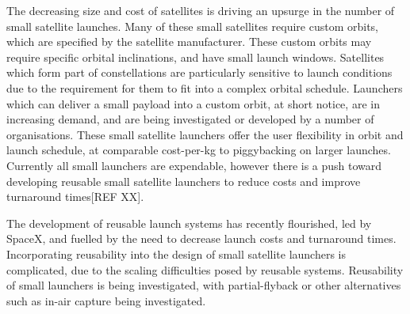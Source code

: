 \documentclass[conf]{new-aiaa}
\begin{document}
The decreasing size and cost of satellites is driving an upsurge in the number of small satellite launches\cite{Faa&Ast&Comstac2015}\cite{Maddock2016}. Many of these small satellites require custom orbits, which are specified by the satellite manufacturer. These custom orbits may require specific orbital inclinations, and have small launch windows. Satellites which form part of constellations are particularly sensitive to launch conditions due to the requirement for them to fit into a complex orbital schedule\cite{Crisp2015}. Launchers which can deliver a small payload into a custom orbit, at short notice, are in increasing demand, and are being investigated or developed by a number of organisations\cite{Maddock2017,Kuhn2017,DARPA2017,charania,Gilmour}. These small satellite launchers offer the user flexibility in orbit and launch schedule, at comparable cost-per-kg to piggybacking on larger launches. Currently all small launchers are expendable, however there is a push toward developing reusable small satellite launchers to reduce costs and improve turnaround times[REF XX].

The development of reusable launch systems has recently flourished, led by SpaceX, and fuelled by the need to decrease launch costs and turnaround times. Incorporating reusability into the design of small satellite launchers is complicated, due to the scaling difficulties posed by reusable systems. Reusability of small launchers is being investigated, with partial-flyback\cite{Adeline} or other alternatives such as in-air capture \cite{Sippel2001} being investigated. 
 
\end{document}
